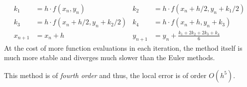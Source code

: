 \begin{description}
        \begin{align}
            k_1     & = h \cdot f(x_n, y_n)                     &
            k_2     & = h \cdot f(x_n + h/2, y_n + k_1/2)         \\
            k_3     & = h \cdot f(x_n + h/2, y_n + k_2/2)       &
            k_4     & = h \cdot f(x_n + h, y_n + k_3)             \\
            x_{n+1} & = x_n + h                                 &
            y_{n+1} & = y_n + \frac{k_1 + 2k_2 + 2k_3 + k_4}{6}
        \end{align}
        At the cost of more function evaluations in each iteration, the method itself
        is much more stable and diverges much slower than the Euler methods. \par
        This method is of \emph{fourth order} and thus, the local error is of order
        $ O(h^5) $.


\end{description}
